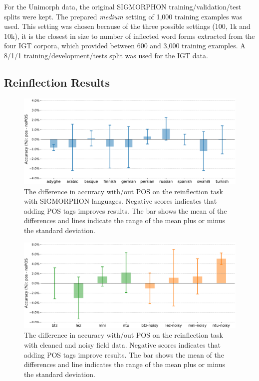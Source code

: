For the Unimorph data, the original SIGMORPHON training/validation/test splits were kept. The prepared \textit{medium} setting of 1,000 training examples was used. This setting was chosen because of the three possible settings (100, 1k and 10k), it is the closest in size to number of inflected word forms extracted from the four IGT corpora, which provided between 600 and 3,000 training examples. A 8/1/1 training/development/tests split was used for the IGT data.


\subsection{Reinflection Results}
\label{sec:inflectionresults}

\begin{figure}[htb]
    \centering
    \includegraphics[width=34em]{figs/pos_2018data.pdf}
    \caption[SIGMORPHON Reinflection with/out POS Tags]{The difference in accuracy with/out POS on the reinflection task with SIGMORPHON languages. Negative scores indicates that adding POS tags improves results. The bar shows the mean of the differences and lines indicate the range of the mean plus or minus the standard deviation.}
    \label{fig:sigreinfl}
\end{figure}

\begin{figure}[ht]
    \centering
    \includegraphics[width=41em]{figs/pos_igtdata.pdf}
    \caption[IGT Reinflection with/out POS Tags]{The difference in accuracy with/out POS on the reinflection task with cleaned and noisy field data. Negative scores indicates that adding POS tags improve results. The bar shows the mean of the differences and line indicates the range of the mean plus or minus the standard deviation.}
    \label{fig:igtreinfl}
\end{figure}


